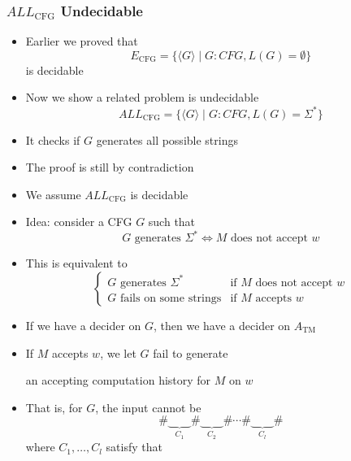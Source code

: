 \begin{frame}[allowframebreaks]
\frametitle{$ALL_{\text{CFG}}$ Undecidable}
\begin{itemize}
\item Earlier we proved that
  \begin{equation*}
  E_{\text{CFG}}
=\{\langle  G\rangle \mid
G: CFG, L(G)=\emptyset\}
\end{equation*}
is decidable
\item Now we show a related problem is undecidable
  \begin{equation*}
  ALL_{\text{CFG}}
=\{\langle  G\rangle \mid
G: CFG, L(G)=\Sigma^* \}
\end{equation*}
\item It checks if $G$ generates all possible strings
\item The proof is still by contradiction
\item[]  We assume $ALL_{\text{CFG}}$ is decidable
\item Idea: consider a CFG $G$ such that
  \begin{equation*}
    G \text{ generates } \Sigma^*
    \Leftrightarrow
    M \text{ does not accept } w
  \end{equation*}
\item This is equivalent to
  \begin{equation*}
    \begin{cases}
      G \text{ generates } \Sigma^*
      &
      \text{if } M \text{ does not accept } w \\
      G \text{ fails on some strings} 
      &
      \text{if } M \text{ accepts } w 
    \end{cases}
  \end{equation*}
\item If we have a decider on $G$, then we have
  a decider on $A_{\text{TM}}$
\item If $M$ accepts $w$, we let $G$ fail to generate
  \begin{center}
    an accepting computation history for $M$ on $w$
  \end{center}
\item That is, for $G$, the input cannot be
  \begin{equation*}
    \#\underbrace{\qquad}_{C_1}\#\underbrace{\qquad}_{C_2}\#\cdots\#\underbrace{\qquad}_{C_l}\#
  \end{equation*}
where $C_1, \ldots, C_l$ satisfy that
  \begin{center}
  \begin{tabular}{l}

\end{tabular}
\end{center}
\end{itemize}
\end{frame}
